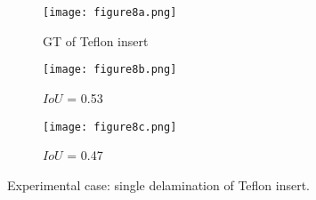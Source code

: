 \begin{figure} [!h]
	\centering
	\begin{subfigure}[b]{0.32\textwidth}
		\centering
		\texttt{[image: figure8a.png]}
		\caption{GT of Teflon insert}
		\label{fig:exp_CFRP_teflon_3o_GT}
	\end{subfigure}
	\hfill
	\begin{subfigure}[b]{0.32\textwidth}
		\centering
		\texttt{[image: figure8b.png]}
		\caption{\(IoU\) = 0.53 } 
		\label{fig:model_1_CFRP_teflon_3o}
	\end{subfigure}
	\hfill
	\begin{subfigure}[b]{0.32\textwidth}
		\centering
		\texttt{[image: figure8c.png]}
		\caption{\(IoU\) = 0.47}
		\label{fig:model_2_CFRP_teflon_3o}
	\end{subfigure}
	\caption{Experimental case: single delamination of Teflon insert.}
	\label{fig:exp_Teflon_insert}
\end{figure} 

